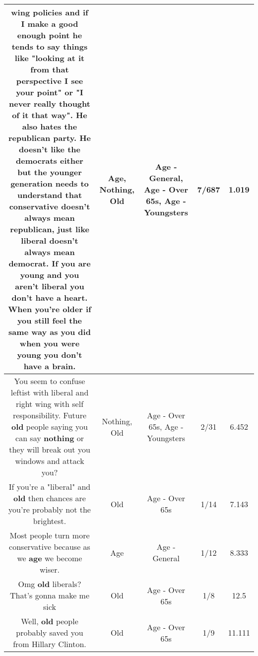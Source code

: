 \documentclass[11pt]{article}
\newlength\mylength
\begin{document}
\begin{center}
\begin{longtable}{|C{.65\mylength}|C{.30\mylength}|C{.12\mylength}|C{.12\mylength}|C{.12\mylength}|}
wing policies and if I make a good enough point he tends to say things like "looking at it from that perspective I see your point" or "I never really thought of it that way". He also hates the republican party. He doesn't like the democrats either but the younger generation needs to understand that conservative doesn't always mean republican, just like liberal doesn't always mean democrat.  If you are young and you aren't liberal you don't have a heart. When you're older if you still feel the same way as you did when you were young you don't have a brain.\normalsize   & Age, Nothing, Old & Age - General, Age - Over 65s, Age - Youngsters & 7/687 & 1.019 \\  \hline
  \small You seem to confuse leftist with liberal and right wing with self responsibility. Future \textbf{old} people saying you can say \textbf{nothing} or they will break out you windows and attack you?\normalsize   & Nothing, Old & Age - Over 65s, Age - Youngsters & 2/31 & 6.452 \\  \hline
  \small If you're a "liberal" and \textbf{old} then chances are you're probably not the brightest.\normalsize   & Old & Age - Over 65s & 1/14 & 7.143 \\  \hline
  \small Most people turn more conservative because as we \textbf{age} we become wiser.\normalsize   & Age & Age - General & 1/12 & 8.333 \\  \hline
  \small Omg \textbf{old} liberals? That's gonna make me sick\normalsize   & Old & Age - Over 65s & 1/8 & 12.5 \\  \hline
  \small Well, \textbf{old} people probably saved you from Hillary Clinton.\normalsize   & Old & Age - Over 65s & 1/9 & 11.111 \\  \hline

\end{longtable}
\end{center}
\end{document}
